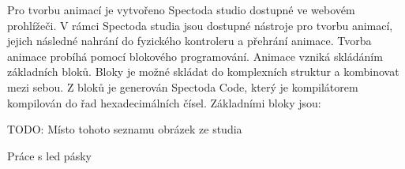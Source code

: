 Pro tvorbu animací je vytvořeno Spectoda studio \cite{Spectoda} dostupné ve webovém prohlížeči. V rámci Spectoda studia jsou dostupné nástroje pro tvorbu animací, jejich následné nahrání do fyzického kontroleru a přehrání animace. Tvorba animace probíhá pomocí blokového programování. Animace vzniká skládáním základních bloků. Bloky je možné skládat do komplexních struktur a kombinovat mezi sebou. Z bloků je generován Spectoda Code, který je kompilátorem kompilován do řad hexadecimálních čísel. Základními bloky jsou:

TODO: Místo tohoto seznamu obrázek ze studia
\begin{description}
  \item []
  \item []
  \item []
  \item []
  \item []
  \item []
  \item []
\end{description}



Práce s led pásky
 
